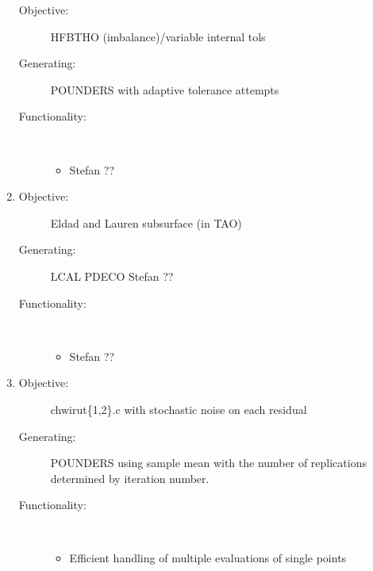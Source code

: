\documentclass{article}
\begin{document}
\begin{enumerate}
\begin{description}
      \item[Objective:] HFBTHO (imbalance)/variable internal tols
      \item[Generating:] POUNDERS with adaptive tolerance attempts
      \item[Functionality:] \
        \begin{itemize}
          \item Stefan ??
        \end{itemize}
    \end{description}
    \bigskip
  \item 
    \begin{description}
      \item[Objective:] Eldad and Lauren subsurface (in TAO) 
      \item[Generating:] LCAL PDECO Stefan ??
      \item[Functionality:] \
        \begin{itemize}
          \item Stefan ??
        \end{itemize}
    \end{description}
    \bigskip
  \item 
    \begin{description}
      \item[Objective:] chwirut\{1,2\}.c with stochastic noise on each residual
      \item[Generating:] POUNDERS using sample mean with the number of replications determined by iteration number. 
      \item[Functionality:] \
        \begin{itemize}
          \item Efficient handling of multiple evaluations of single points
        \end{itemize}
    \end{description}
\end{enumerate}


% 
% 
\end{document}

